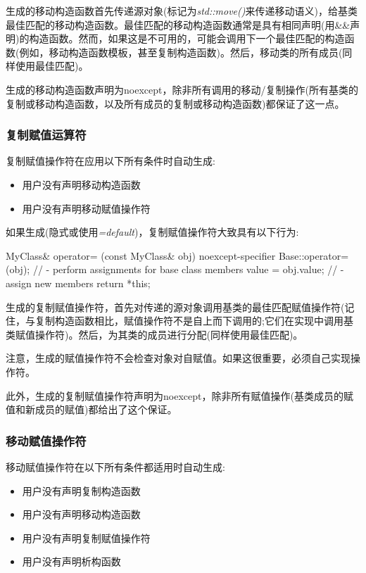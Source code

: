 生成的移动构造函数首先传递源对象(标记为\textit{std::move()}来传递移动语义)，给基类最佳匹配的移动构造函数。最佳匹配的移动构造函数通常是具有相同声明(用\&\&声明)的构造函数。然而，如果这是不可用的，可能会调用下一个最佳匹配的构造函数(例如，移动构造函数模板，甚至复制构造函数)。然后，移动类的所有成员(同样使用最佳匹配)。

生成的移动构造函数声明为noexcept，除非所有调用的移动/复制操作(所有基类的复制或移动构造函数，以及所有成员的复制或移动构造函数)都保证了这一点。

\subsubsection{复制赋值运算符}

复制赋值操作符在应用以下所有条件时自动生成:

\begin{itemize}
	\item 用户没有声明移动构造函数
	\item 用户没有声明移动赋值操作符
\end{itemize}

如果生成(隐式或使用\textit{=default})，复制赋值操作符大致具有以下行为:

\begin{cppcode}
MyClass& operator= (const MyClass& obj) noexcept-specifier {
	Base::operator=(obj); // - perform assignments for base class members
	value = obj.value; // - assign new members
	return *this;
}
\end{cppcode}

生成的复制赋值操作符，首先对传递的源对象调用基类的最佳匹配赋值操作符(记住，与复制构造函数相比，赋值操作符不是自上而下调用的;它们在实现中调用基类赋值操作符)。然后，为其类的成员进行分配(同样使用最佳匹配)。

注意，生成的赋值操作符不会检查对象对自赋值。如果这很重要，必须自己实现操作符。

此外，生成的复制赋值操作符声明为noexcept，除非所有赋值操作(基类成员的赋值和新成员的赋值)都给出了这个保证。

\subsubsection{移动赋值操作符}

移动赋值操作符在以下所有条件都适用时自动生成:

\begin{itemize}
	\item 用户没有声明复制构造函数
	\item 用户没有声明移动构造函数
	\item 用户没有声明复制赋值操作符
	\item 用户没有声明析构函数
\end{itemize}

